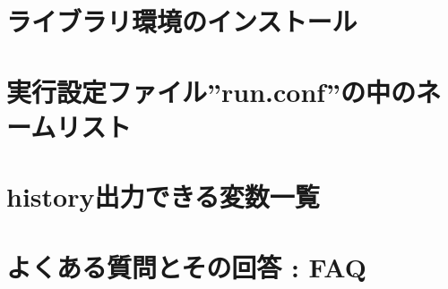 \documentclass[a4paper]{jreport}
\begin{document}
\begin{appendix}
\chapter{ライブラリ環境のインストール} \label{achap:env_setting}

\chapter{実行設定ファイル''run.conf''の中のネームリスト} \label{achap:namelist}

\chapter{history出力できる変数一覧} \label{achap:histroy_item}

\chapter{よくある質問とその回答 : FAQ} \label{achap:practice}


%
\end{appendix}

\ClearWallPaper

\end{document}
